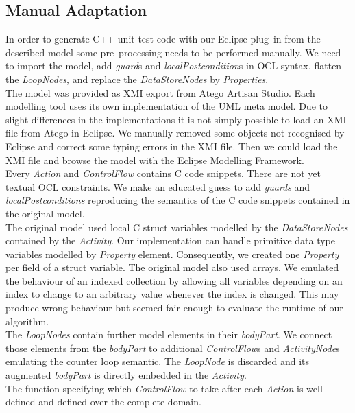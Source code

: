 \documentclass[runningheads,a4paper]{llncs}%
\newcommand{\UMLType}[1]{\textsf{\textit{#1}}} %
\newcommand{\UMLReference}[1]{\textsf{\textit{#1}}} %
\begin{document}
\subsection{Manual Adaptation}%
In order to generate C++ unit test code with our Eclipse plug--in from the described model some pre--processing needs to be performed manually. We need to import the model, add \UMLReference{guard}s and \UMLReference{localPostcondition}s in OCL syntax, flatten the \UMLType{LoopNodes}, and replace the \UMLType{DataStoreNodes} by \UMLType{Properties}.\\%
The model was provided as XMI export from Atego\textsuperscript{\textregistered} Artisan Studio. Each modelling tool uses its own implementation of the UML meta model. Due to slight differences in the implementations it is not simply possible to load an XMI file from Atego\textsuperscript{\textregistered} in Eclipse. We manually removed some objects not recognised by Eclipse and correct some typing errors in the XMI file. Then we could load the XMI file and browse the model with the Eclipse Modelling Framework.\\%
Every \UMLType{Action} and \UMLReference{ControlFlow} contains C code snippets. There are not yet textual OCL constraints. We make an educated guess to add \UMLReference{guards} and \UMLReference{localPostconditions} reproducing the semantics of the C code snippets contained in the original model.\\%
The original model used local C struct variables modelled by the \UMLType{DataStoreNodes} contained by the \UMLType{Activity}. Our implementation can handle primitive data type variables modelled by \UMLType{Property} element. Consequently, we created one \UMLType{Property} per field of a struct variable. The original model also used arrays. We emulated the behaviour of an indexed collection by allowing all variables depending on an index to change to an arbitrary value whenever the index is changed. This may produce wrong behaviour but seemed fair enough to evaluate the runtime of our algorithm.\\
The \UMLType{LoopNodes} contain further model elements in their \UMLReference{bodyPart}. We connect those elements from the \UMLReference{bodyPart} to additional \UMLType{ControlFlow}s and \UMLType{ActivityNode}s emulating the counter loop semantic. The \UMLType{LoopNode} is discarded and its augmented \UMLReference{bodyPart} is directly embedded in the \UMLType{Activity}.%
\\%
The function specifying which \UMLType{ControlFlow} to take after each \UMLType{Action} is well--defined and defined over the complete domain.%
\end{document}
